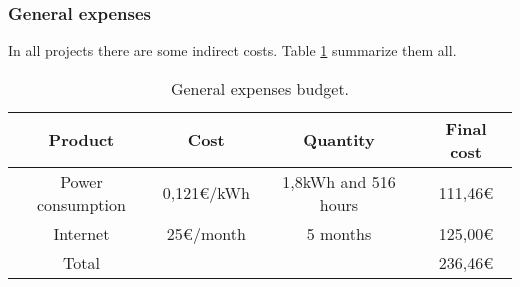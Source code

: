 \subsubsection{General expenses}
In all projects there are some indirect costs. Table \ref{tab:othercosts} summarize them all.

\begin{table}[!htb]
\centering
  \begin{tabular}{| c | c | c | c |}
  \hline Product & Cost & Quantity & Final cost \\ \hline 
  Power consumption & 0,121€/kWh & 1,8kWh and 516 hours & 111,46€  \\ \hline
  Internet & 25€/month & 5 months & 125,00€        \\ \hline \hline   
  Total & & & 236,46€  \\ \hline 
  \end{tabular}
  \caption{General expenses budget.} \vspace{3pt}
  \label{tab:othercosts}
\end{table}
